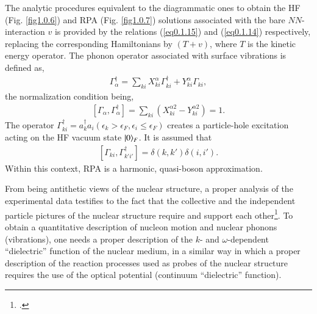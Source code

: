The analytic procedures equivalent  to the diagrammatic ones to obtain the HF (Fig. \ref{fig1.0.6}) and RPA (Fig. \ref{fig1.0.7}) solutions associated with the bare $NN$-interaction $v$ is provided by the relations (\ref{eq0.1.15}) and (\ref{eq0.1.14}) respectively, replacing the corresponding Hamiltonians by $(T+v)$, where $T$ is the kinetic energy operator. The phonon operator associated with surface vibrations is defined as,
\begin{align}\label{eq1.0.26}
\Gamma_\alpha^\dagger=\sum_{ki}X_{ki}^\alpha\Gamma_{ki}^\dagger+Y_{ki}^\alpha\Gamma_{ki},
\end{align}
 the normalization condition being, 
\begin{align}\label{eq1.0.27}
\left[\Gamma_\alpha,\Gamma_\alpha^\dagger\right]=\sum_{ki}\left(X_{ki}^{\alpha2}-Y_{ki}^{\alpha2}\right)=1.
\end{align}
The operator $\Gamma^\dagger_{ki}=a^\dagger_{k}a_{i} (\epsilon_k>\epsilon_F,\epsilon_i\leq\epsilon_F)$ creates a particle-hole excitation acting on the HF vacuum state $|{0} \rangle_F$. It is assumed that
\begin{align}\label{eq1.0.28}
\left[\Gamma_{ki},\Gamma_{k'i'}^\dagger\right]=\delta(k,k')\delta(i,i').
\end{align}
Within this context, RPA is a harmonic, quasi-boson approximation.


From being antithetic views of the nuclear structure, a proper analysis of the experimental data testifies to the fact that the collective and the independent particle pictures of the nuclear structure require and support each other\footnote{\cite{Bohr:75}.}. To obtain a quantitative description of nucleon  motion and nuclear phonons (vibrations), one needs a proper description of the $k$- and $\omega$-dependent ``dielectric'' function of the nuclear medium, in a similar way in which a proper description of the reaction processes used as probes of the nuclear structure requires the use of the optical potential (continuum ``dielectric'' function). 


